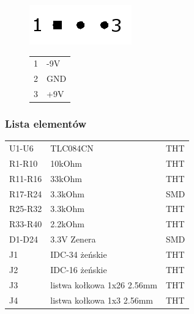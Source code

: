 ﻿\documentclass{article}
\begin{document}
\begin{figure}[h!]
	\centering
	\includegraphics[width=\textwidth/10]{J4.png}
	\caption{J4 - pinout}
	\label{rys:J4 - pinout}

	\begin{table}
	\centering
	\label{J4 - pinout}
	\begin{tabular}{ll}
	1 		&	-9V					\\
	2		&	GND					\\
	3		&	+9V					\\
\end{tabular}
\end{table}
\end{figure}

\subsubsection{Lista elementów}
\begin{table}
	\centering
	\label{Bill of materials}
\begin{tabular}{lll}
U1-U6		&	TLC084CN			&	THT	\\
R1-R10		&	10kOhm				&	THT	\\
R11-R16		&	33kOhm				&	THT	\\
R17-R24		&	3.3kOhm				&	SMD	\\
R25-R32		&	3.3kOhm				&	THT	\\
R33-R40		&	2.2kOhm				&	THT	\\
D1-D24		&	3.3V Zenera			&	SMD	\\
J1		&	IDC-34 żeńskie			&	THT	\\
J2		&	IDC-16 żeńskie			&	THT	\\
J3		&	listwa kołkowa 1x26 2.56mm	&	THT	\\
J4		&	listwa kołkowa 1x3 2.56mm	&	THT	\\
\end{tabular}
\end{table}
\end{document}
